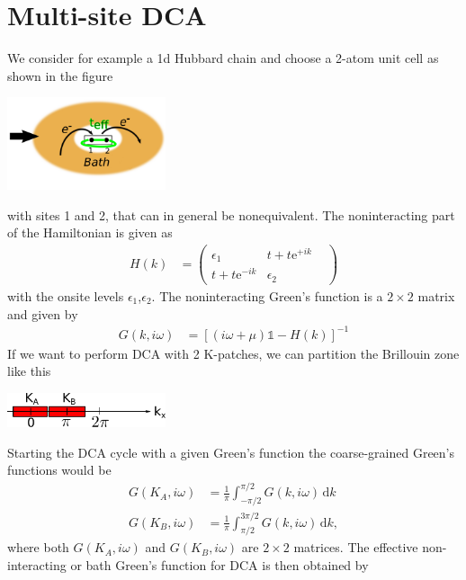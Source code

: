 \documentclass[12pt,a4paper]{scrartcl}
\numberwithin{equation}{section}
\newcommand{\unity}{\mathds{1}}
\begin{document}
\section{Multi-site DCA}
We consider for example a 1d Hubbard chain and choose a 2-atom unit cell as shown in the figure
\begin{center}
\includegraphics[width=0.35\textwidth]{dca/1dchain.png}                                                      
\end{center}
with sites 1 and 2, that can in general be nonequivalent.
The noninteracting part of the Hamiltonian is given as
\begin{align}
 H(k) &= 
 \begin{pmatrix}
  \epsilon_1 & t + t\mathrm{e}^{+ik} \\
   t + t\mathrm{e}^{-ik} & \epsilon_2 & 
 \end{pmatrix}
\end{align}
with the onsite levels $\epsilon_1$,$\epsilon_2$. The noninteracting Green's function is
a $2\times 2$ matrix and given by
\begin{align}
 G(k,i\omega)
 &= [(i\omega+\mu) \unity - H(k)]^{-1}
\end{align}
If we want to perform DCA with 2 K-patches, we can partition the Brillouin zone like this
\begin{center}
\includegraphics[width=0.35\textwidth]{dca/2patch.png}                                                      
\end{center}
Starting the DCA cycle with a given Green's function the coarse-grained Green's functions would be
\begin{align}
 G(K_A,i\omega) &= \frac{1}{\pi} \int_{-\pi/2}^{\pi/2} G(k,i\omega) \, \mathrm{d}k \\
 G(K_B,i\omega) &= \frac{1}{\pi} \int_{\pi/2}^{3\pi/2} G(k,i\omega)\, \mathrm{d}k, \label{eq:DCA_coarseGF}
\end{align}
where both $G(K_A,i\omega)$ and $G(K_B,i\omega)$ are $2\times 2$ matrices.
The effective non-interacting or bath Green's function for DCA is then obtained by
\end{document}
